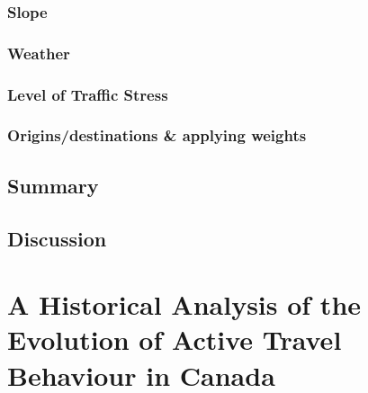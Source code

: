 \documentclass[
11pt, %
oneside, %
english, %
singlespacing, %
]{macthesis} %
\begin{document}
\hypertarget{slope}{%
\subsection{Slope}\label{slope}}

\hypertarget{weather}{%
\subsection{Weather}\label{weather}}

\hypertarget{level-of-traffic-stress}{%
\subsection{Level of Traffic Stress}\label{level-of-traffic-stress}}

\hypertarget{originsdestinations-applying-weights}{%
\subsection{Origins/destinations \& applying weights}\label{originsdestinations-applying-weights}}

\hypertarget{summary}{%
\section{Summary}\label{summary}}

\hypertarget{discussion}{%
\section{Discussion}\label{discussion}}

\hypertarget{math-sci}{%
\chapter{A Historical Analysis of the Evolution of Active Travel Behaviour in Canada}\label{math-sci}}
\end{document}
